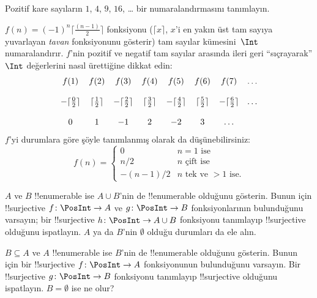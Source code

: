 \begin{prob}
Pozitif kare sayıların $1$, $4$, $9$, $16$, \dots{} bir numaralandırmasını
tanımlayın.
\end{prob}

\begin{ex}
$f(n) = (-1)^{n} \lceil \frac{(n-1)}{2}\rceil$ fonksiyonu ($\lceil x
\rceil$, $x$'i en yakın üst tam sayıya yuvarlayan \emph{tavan} fonksiyonunu
gösterir) tam sayılar kümesini~$\Int$ numaralandırır. $f$'nin pozitif ve
negatif tam sayılar arasında ileri geri ``sıçrayarak'' $\Int$ değerlerini
nasıl ürettiğine dikkat edin:
\[
\begin{array}{c c c c c c c c}
f(1) & f(2) & f(3) & f(4) & f(5) & f(6) & f(7) & \dots \\ \\
- \lceil \tfrac{0}{2} \rceil & \lceil \tfrac{1}{2}\rceil & - \lceil \tfrac{2}{2} \rceil & \lceil \tfrac{3}{2} \rceil & - \lceil \tfrac{4}{2} \rceil  & \lceil \tfrac{5}{2}
\rceil & - \lceil \tfrac{6}{2} \rceil & \dots \\ \\
0 & 1 & -1 & 2 & -2 & 3 & \dots
\end{array}
\]
$f$'yi durumlara göre şöyle tanımlanmış olarak da düşünebilirsiniz:
\[
f(n) = \begin{cases}
  0 & \text{$n = 1$ ise}\\
  n/2 & \text{$n$ çift ise}\\
  -(n-1)/2 & \text{$n$ tek ve $>1$ ise.}
  \end{cases}
\]
\end{ex}

\begin{prob}
  $A$ ve $B$ !!{enumerable} ise $A \cup B$'nin de !!{enumerable} olduğunu
  gösterin. Bunun için !!{surjective} $f\colon \PosInt \to A$ ve $g\colon
  \PosInt \to B$ fonksiyonlarının bulunduğunu varsayın; bir !!{surjective}
  $h\colon \PosInt \to A \cup B$ fonksiyonu tanımlayıp !!{surjective}
  olduğunu ispatlayın. $A$ ya da $B$'nin $\emptyset$ olduğu durumları da ele
  alın.
\end{prob}

\begin{prob}
  $B \subseteq A$ ve $A$ !!{enumerable} ise $B$'nin de !!{enumerable}
  olduğunu gösterin. Bunun için bir !!{surjective} $f\colon \PosInt \to A$
  fonksiyonunun bulunduğunu varsayın. Bir !!{surjective} $g\colon \PosInt
  \to B$ fonksiyonu tanımlayıp !!{surjective} olduğunu ispatlayın. $B =
  \emptyset$ ise ne olur?
\end{prob}

